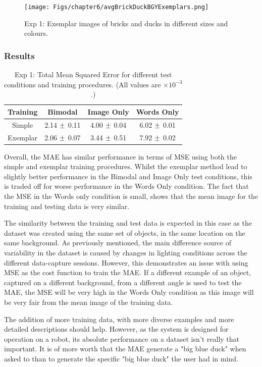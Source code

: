 \begin{figure}[ht]
    \centering
    \texttt{[image: Figs/chapter6/avgBrickDuckBGYExemplars.png]}
    \caption{Exp 1: Exemplar images of bricks and ducks in different sizes and colours.}
    \label{fig:ExmBrickDuck}
\end{figure}

\subsubsection{Results}

\begin{table}[h!]
\centering
	\begin{tabular}{|c|c|c|c|}
	\hline
\textbf{Training} & 	\textbf{Bimodal} & 	\textbf{Image Only} 	& 	\textbf{Words Only} \\ \hline
Simple & 2.14 $\mypm$ 0.11 & 4.00	$\mypm$ 0.04 & 6.02 $\mypm$ 	0.01 \\ \hline
Exemplar & 2.06 $\mypm$ 0.07 & 3.44 $\mypm$ 0.51 & 7.92	$\mypm$ 0.02 \\ \hline
\end{tabular}
\caption{Exp 1: Total Mean Squared Error for different test conditions and training procedures. (All values are $\times10^{-3}$.)}
\label{tab:6_res_exp1}
\end{table}

Overall, the MAE has similar performance in terms of MSE using both the simple and exemplar training procedures. Whilst the exemplar method lead to slightly better performance in the Bimodal and Image Only test conditions, this is traded off for worse performance in the Words Only condition. The fact that the MSE in the Words only condition is small, shows that the mean image for the training and testing data is very similar.

The similarity between the training and test data is expected in this case as the dataset was created using the same set of objects, in the same location on the same background. As previously mentioned, the main difference source of variability in the dataset is caused by changes in lighting conditions across the different data-capture sessions. However, this demonstrates an issue with using MSE as the cost function to train the MAE. If a different example of an object, captured on a different background, from a different angle is used to test the MAE, the MSE will be very high in the Words Only condition as this image will be very fair from the mean image of the training data.

The addition of more training data, with more diverse examples and more detailed descriptions should help. However, as the system is designed for operation on a robot, its absolute performance on a dataset isn't really that important. It is of more worth that the MAE generate a "big blue duck" when asked to than to generate the specific "big blue duck" the user had in mind.


